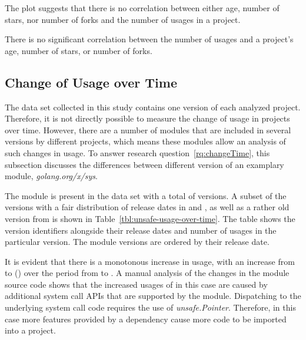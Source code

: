 

The plot suggests that there is no correlation between either age, number of stars, nor number of forks and the number
of \unsafe{} usages in a project.

\begin{tcolorbox}[boxsep=3pt, enlarge top by=5pt, title=Answer to~\ref{rq:popularity}]
    There is no significant correlation between the number of \unsafe{} usages and a project's age, number of stars, or
    number of forks.
\end{tcolorbox}



\subsection{Change of Usage over Time}\label{subsec:go-geiger:evaluation:over-time}

The data set collected in this study contains one version of each analyzed project.
Therefore, it is not directly possible to measure the change of \unsafe{} usage in projects over time.
However, there are a number of modules that are included in several versions by different projects, which means these
modules allow an analysis of such changes in \unsafe{} usage.
To answer research question~\ref{rq:changeTime}, this subsection discusses the differences between different version of
an examplary module, \textit{golang.org/x/sys}.

The module is present in the data set with a total of \sysModuleVersions{} versions.
A subset of the versions with a fair distribution of release dates in  and , as well as a
rather old version from  is shown in Table~\ref{tbl:unsafe-usage-over-time}.
The table shows the version identifiers alongside their release dates and number of \unsafe{} usages in the particular
version.
The module versions are ordered by their release date.



It is evident that there is a monotonous increase in \unsafe{} usage, with an increase from \sysModuleLeastUnsafe{} to
\sysModuleMostUnsafe{} (\sysModuleUnsafeIncrease) over the  period from  to
.
A manual analysis of the changes in the module source code shows that the increased usages of \unsafe{} in this case are
caused by additional system call \acrshort{API}s that are supported by the module.
Dispatching to the underlying system call code requires the use of \textit{unsafe.Pointer}.
Therefore, in this case more features provided by a dependency cause more \unsafe{} code to be imported into a project.

